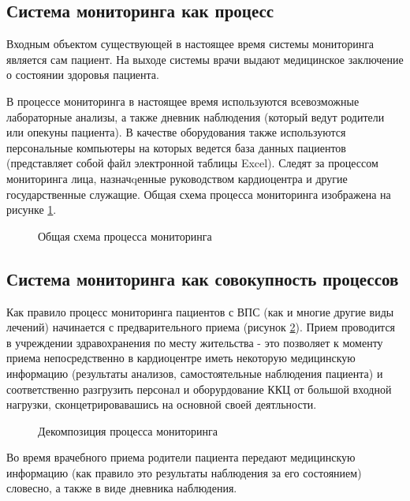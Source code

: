 \subsection{Система мониторинга как процесс}

Входным объектом существующей в настоящее время системы мониторинга является сам
пациент. На выходе системы врачи выдают медицинское заключение о состоянии
здоровья пациента.

В процессе мониторинга в настоящее время используются всевозможные лабораторные
анализы, а также дневник наблюдения (который ведут родители или опекуны
пациента). В качестве оборудования также используются персональные компьютеры на
которых ведется база данных пациентов (представляет собой файл электронной
таблицы Excel). Следят за процессом мониторинга лица, назначqенные руководством
кардиоцентра и другие государственные служащие. Общая схема процесса мониторинга
изображена на рисунке \ref{ris:before_decomposition}.

\begin{figure}[h]
\caption{Общая схема процесса мониторинга}
\label{ris:before_decomposition}
\end{figure}

\subsection{Система мониторинга как совокупность процессов}

Как правило процесс мониторинга пациентов с ВПС (как и многие другие виды
лечений) начинается с предварительного приема (рисунок \ref{ris:as_is_general_diagram}). Прием
проводится в учреждении здравохранения по месту жительства - это позволяет к моменту приема
непосредственно в кардиоцентре  иметь некоторую медицинскую информацию
(результаты анализов, самостоятельные наблюдения пациента) и соответственно
разгрузить персонал и оборурдование ККЦ от большой входной нагрузки,
сконцетрировавашись на основной своей деятльности.

\begin{figure}[h]
\caption{Декомпозиция процесса мониторинга}
\label{ris:as_is_general_diagram}
\end{figure}

Во время врачебного приема родители пациента передают медицинскую информацию
(как правило это результаты наблюдения за его состоянием) словесно, а также  в
виде дневника наблюдения.

